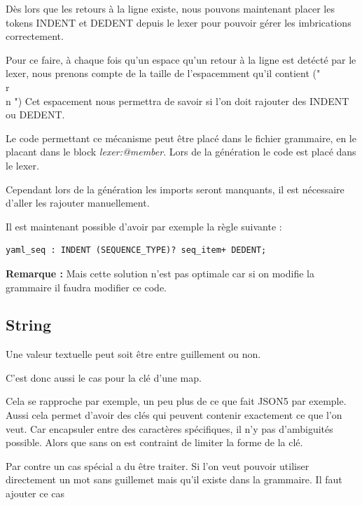 \documentclass[
    iict, %
    il, %
]{heig-tb}
\begin{document}
Dès lors que les retours à la ligne existe, nous pouvons maintenant placer les tokens INDENT et DEDENT depuis le lexer
pour pouvoir gérer les imbrications correctement.

Pour ce faire, à chaque fois qu'un espace qu'un retour à la ligne est detécté par le lexer, nous prenons compte de la taille de l'espacemment qu'il contient ("\\r\\n    ")
Cet espacement nous permettra de savoir si l'on doit rajouter des INDENT ou DEDENT.

Le code permettant ce mécanisme peut être placé dans le fichier grammaire, en le placant dans le block \emph{lexer:@member{}}.
Lors de la génération le code est placé dans le lexer.

Cependant lors de la génération les imports seront manquants, il est nécessaire d'aller les rajouter manuellement.



Il est maintenant possible d'avoir par exemple la règle suivante :

\begin{lstlisting}[frame=single,caption={generator-code},label={generator-code}]
    yaml_seq : INDENT (SEQUENCE_TYPE)? seq_item+ DEDENT;
\end{lstlisting}

\textbf{Remarque : } Mais cette solution n'est pas optimale car si on modifie la grammaire il faudra modifier ce code.

\subsection{String}
Une valeur textuelle peut soit être entre guillement ou non.

C'est donc aussi le cas pour la clé d'une map.

Cela se rapproche par exemple, un peu plus de ce que fait JSON5 par exemple. %
Aussi cela permet d'avoir des clés qui peuvent contenir exactement ce que l'on veut.
Car encapsuler entre des caractères spécifiques, il n'y pas d'ambiguités possible. Alors que sans on est contraint de limiter la forme de la clé.

Par contre un cas spécial a du être traiter. Si l'on veut pouvoir utiliser directement un mot sans guillemet mais qu'il existe dans la grammaire.
Il faut ajouter ce cas %
\end{document}
